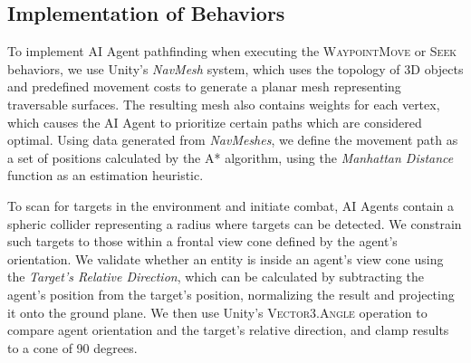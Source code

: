 


\subsection{Implementation of Behaviors}


To implement AI Agent pathfinding when executing the \textsc{WaypointMove} or \textsc{Seek} behaviors, we use Unity's \emph{NavMesh} system, which uses the topology of 3D objects and predefined movement costs to generate a planar mesh representing traversable surfaces. The resulting mesh also contains weights for each vertex, which causes the AI Agent to prioritize certain paths which are considered optimal. Using  data generated from \emph{NavMeshes}, we define the movement path as a set of positions calculated by the \textsc{A*} algorithm, using the \emph{Manhattan Distance} function as an estimation heuristic.

To scan for targets in the environment and initiate combat, AI Agents contain a spheric collider representing a radius where targets can be detected. We constrain such targets to those within a frontal view cone defined by the agent's orientation.  We validate whether an entity is inside an agent's view cone using the \emph{Target's Relative Direction}, which can be calculated by subtracting the agent's position from the target's position, normalizing the result and projecting it onto the ground plane. We then use Unity's \textsc{Vector3.Angle} operation to compare agent orientation and the target's relative direction, and clamp results to a cone of 90 degrees.

